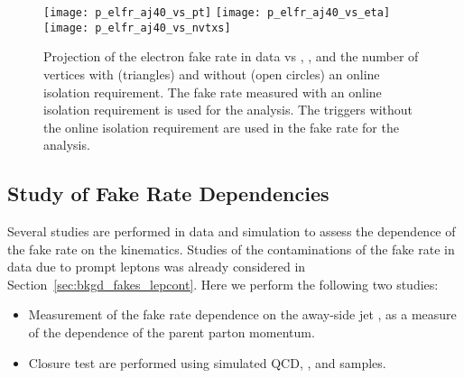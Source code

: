 \begin{figure}[!hbt]
\begin{center}
\texttt{[image: p\_elfr\_aj40\_vs\_pt]}
\texttt{[image: p\_elfr\_aj40\_vs\_eta]}
\texttt{[image: p\_elfr\_aj40\_vs\_nvtxs]}
\caption[Electron Fake Rate vs \pt, \aeta, and number of vertices]
{\label{fig:bkgd_fakes_fr_elfr_aj}
Projection of the electron fake rate in data vs \aeta, \pt, and the number
of vertices with (triangles) and without (open circles) an online isolation
requirement. The fake rate measured with an online isolation requirement
is used for the \hpt analysis. The triggers without the online isolation
requirement are used in the fake rate for the \lpt analysis.
}
\end{center}
\end{figure}
% 
\subsection{Study of Fake Rate Dependencies}
\label {sec:bkgd_fakes_frstudy}
Several studies are performed in data and simulation to assess the dependence
of the fake rate on the kinematics. Studies of the contaminations of
the fake rate in data due to prompt leptons was already considered in
Section~\ref{sec:bkgd_fakes_lepcont}. Here we perform the following two
studies:
\begin{itemize}
\item Measurement of the fake rate dependence on the away-side jet \pt, as a
measure of the dependence of the parent parton momentum.
\item Closure test are performed using simulated QCD, \Wj, and \ttbar samples.
\end{itemize}

